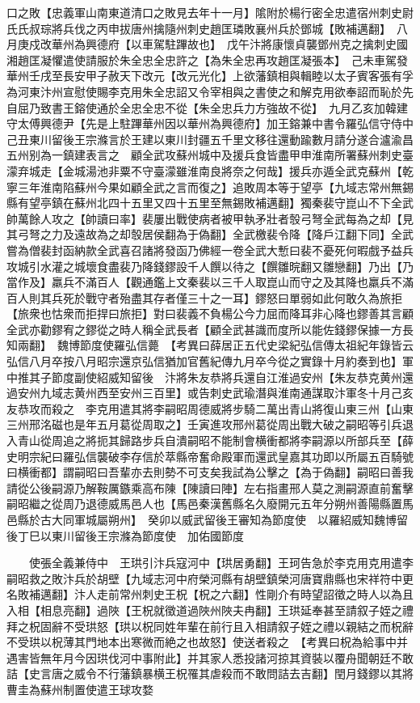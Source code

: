 口之敗【忠義軍山南東道清口之敗見去年十一月】隂附於楊行密全忠遣宿州刺史尉氏氏叔琮將兵伐之丙申拔唐州擒隨州刺史趙匡璘敗襄州兵於鄧城【敗補邁翻】　八月庚戍改華州為興德府【以車駕駐蹕故也】　戊午汴將康懷貞襲鄧州克之擒刺史國湘趙匡凝懼遣使請服於朱全忠全忠許之【為朱全忠再攻趙匡凝張本】　己未車駕發華州壬戌至長安甲子赦天下改元【改元光化】上欲藩鎮相與輯睦以太子賓客張有孚為河東汴州宣慰使賜李克用朱全忠詔又令宰相與之書使之和解克用欲奉詔而恥於先自屈乃致書王鎔使通於全忠全忠不從【朱全忠兵力方強故不從】　九月乙亥加韓建守太傅興德尹【先是上駐蹕華州因以華州為興德府】加王鎔兼中書令羅弘信守侍中　己丑東川留後王宗滌言於王建以東川封疆五千里文移往還動踰數月請分遂合瀘渝昌五州别為一鎮建表言之　顧全武攻蘇州城中及援兵食皆盡甲申淮南所署蘇州刺史臺濛弃城走【金城湯池非粟不守臺濛雖淮南良將奈之何哉】援兵亦遁全武克蘇州【乾寧三年淮南陷蘇州今果如顧全武之言而復之】追敗周本等于望亭【九域志常州無錫縣有望亭鎮在蘇州北四十五里又四十五里至無錫敗補邁翻】獨秦裴守崑山不下全武帥萬餘人攻之【帥讀曰率】裴屢出戰使病者被甲執矛壯者彀弓弩全武每為之却【見其弓弩之力及遠故為之却彀居侯翻為于偽翻】全武檄裴令降【降戶江翻下同】全武嘗為僧裴封函納款全武喜召諸將發函乃佛經一卷全武大慙曰裴不憂死何暇戲予益兵攻城引水灌之城壞食盡裴乃降錢鏐設千人饌以待之【饌雛晥翻又雛戀翻】乃出【乃當作及】羸兵不滿百人【觀通鑑上文秦裴以三千人取崑山而守之及其降也羸兵不滿百人則其兵死於戰守者殆盡其存者僅三十之一耳】鏐怒曰單弱如此何敢久為旅拒【旅衆也怙衆而拒捍曰旅拒】對曰裴義不負楊公今力屈而降耳非心降也鏐善其言顧全武亦勸鏐宥之鏐從之時人稱全武長者【顧全武甚識而度所以能佐錢鏐保據一方長知兩翻】　魏博節度使羅弘信薨　【考異曰薛居正五代史梁紀弘信傳太祖紀年錄皆云弘信八月卒按八月昭宗還京弘信猶加官舊紀傳九月卒今從之實錄十月約奏到也】軍中推其子節度副使紹威知留後　汴將朱友恭將兵還自江淮過安州【朱友恭克黄州還過安州九域志黄州西至安州三百里】或告刺史武瑜潛與淮南通謀取汴軍冬十月己亥友恭攻而殺之　李克用遣其將李嗣昭周德威將步騎二萬出青山將復山東三州【山東三州邢洺磁也是年五月葛從周取之】壬寅進攻邢州葛從周出戰大破之嗣昭等引兵退入青山從周追之將扼其歸路步兵自潰嗣昭不能制會横衝都將李嗣源以所部兵至【薛史明宗紀曰羅弘信襲破李存信於萃縣帝奮命殿軍而還武皇嘉其功即以所屬五百騎號曰横衝都】謂嗣昭曰吾輩亦去則勢不可支矣我試為公擊之【為于偽翻】嗣昭曰善我請從公後嗣源乃解鞍厲鏃乘高布陳【陳讀曰陣】左右指畫邢人莫之測嗣源直前奮擊嗣昭繼之從周乃退德威馬邑人也【馬邑秦漢舊縣名久廢開元五年分朔州善陽縣置馬邑縣於古大同軍城屬朔州】　癸卯以威武留後王審知為節度使　以羅紹威知魏博留後丁巳以東川留後王宗滌為節度使　加佑國節度

　　使張全義兼侍中　王珙引汴兵寇河中【珙居勇翻】王珂告急於李克用克用遣李嗣昭救之敗汴兵於胡壁【九域志河中府榮河縣有胡壁鎮榮河唐寶鼎縣也宋祥符中更名敗補邁翻】汴人走前常州刺史王柷【柷之六翻】性剛介有時望詔徵之時人以為且入相【相息亮翻】過陜【王柷就徵道過陜州陜夫冉翻】王珙延奉甚至請叙子姪之禮拜之柷固辭不受珙怒【珙以柷同姓年輩在前行且入相請叙子姪之禮以親結之而柷辭不受珙以柷薄其門地本出寒微而絶之也故怒】使送者殺之　【考異曰柷為給事中并遇害皆無年月今因珙伐河中事附此】并其家人悉投諸河掠其資裝以覆舟聞朝廷不敢詰【史言唐之威令不行藩鎮暴横王柷罹其虐殺而不敢問詰去吉翻】閏月錢鏐以其將曹圭為蘇州制置使遣王球攻婺

